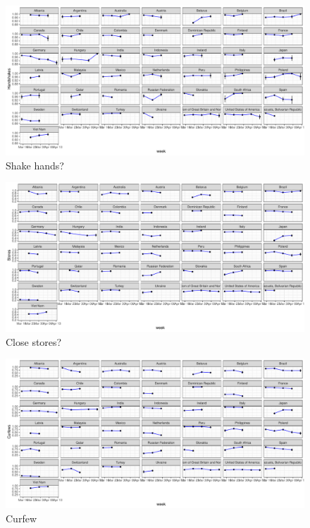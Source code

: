 \documentclass[
  english,
  ,doc,floatsintext]{apa6}
\begin{document}
\begin{figure}
\centering
\includegraphics{covid-19_2_files/figure-latex/fobH-1.pdf}
\caption{\label{fig:fobH}Shake hands?}
\end{figure}

\begin{figure}
\centering
\includegraphics{covid-19_2_files/figure-latex/fobST-1.pdf}
\caption{\label{fig:fobST}Close stores?}
\end{figure}

\begin{figure}
\centering
\includegraphics{covid-19_2_files/figure-latex/fobCRF-1.pdf}
\caption{\label{fig:fobCRF}Curfew}
\end{figure}
\end{document}
